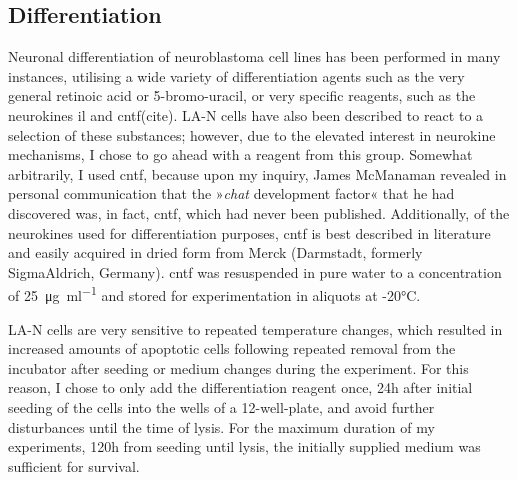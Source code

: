 \subsection{Differentiation}
Neuronal differentiation of neuroblastoma cell lines has been performed in many instances, utilising a wide variety of differentiation agents such as the very general retinoic acid or 5-bromo-uracil, or very specific reagents, such as the neurokines \ac{il} and \ac{cntf}(cite). LA-N cells have also been described to react to a selection of these substances; however, due to the elevated interest in neurokine mechanisms, I chose to go ahead with a reagent from this group. Somewhat arbitrarily, I used \ac{cntf}, because upon my inquiry, James McManaman revealed in personal communication that the »\textit{\ac{chat}} development factor« that he had discovered\cite{McManaman1988} was, in fact, \ac{cntf}, which had never been published. Additionally, of the neurokines used for differentiation purposes, \ac{cntf} is best described in literature and easily acquired in dried form from Merck (Darmstadt, formerly SigmaAldrich, Germany). \ac{cntf} was resuspended in pure water to a concentration of \SI{25}{\micro\gram\per\milli\litre} and stored for experimentation in aliquots at -20°C.

LA-N cells are very sensitive to repeated temperature changes, which resulted in increased amounts of apoptotic cells following repeated removal from the incubator after seeding or medium changes during the experiment. For this reason, I chose to only add the differentiation reagent once, 24h after initial seeding of the cells into the wells of a 12-well-plate, and avoid further disturbances until the time of lysis. For the maximum duration of my experiments, 120h from seeding until lysis, the initially supplied medium was sufficient for survival.

